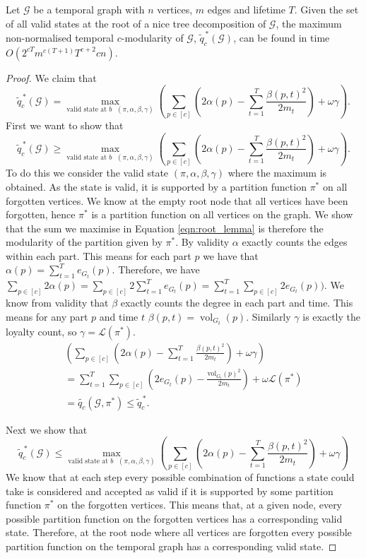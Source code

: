 \documentclass[runningheads]{llncs}
\DeclareMathOperator{\vol}{vol}
\newcommand{\cG}{\mathcal{G}}
\newcommand{\loy}{\mathcal{L}}
\begin{document}
\begin{lemma}\label{lem:tw root}
Let $\cG$ be a temporal graph with $n$ vertices, $m$ edges and lifetime $T$.
Given the set of all valid states at the root of a nice tree decomposition of $\cG$, the maximum non-normalised temporal $c$-modularity of $\cG$, $\widetilde{q}^{\,*}_c(\cG)$, can be found in time $O(2^{cT}m^{c(T+1)}T^{c+2}cn)$. 
\end{lemma}
\begin{proof}
We claim that
\begin{equation}\label{eqn:root_lemma}
\widetilde{q}^{\,*}_c(\cG)=\max_{\text{valid state at $b$ }(\pi,\alpha,\beta,\gamma)} \left(\sum_{p \in [c]} \left( 2\alpha(p) -\sum_{t=1}^T  \frac{\beta(p,t)^2}{2m_t}\right) + \omega \gamma\right).
\end{equation}
First we want to show that 
\[\widetilde{q}^{\,*}_c(\cG)\geq\max_{\text{valid state at $b$ }(\pi,\alpha,\beta,\gamma)} \left(\sum_{p \in [c]} \left( 2\alpha(p) -\sum_{t=1}^T  \frac{\beta(p,t)^2}{2m_t}\right) + \omega \gamma\right).\]
To do this we consider the valid state $(\pi,\alpha,\beta,\gamma)$ where the maximum is obtained. As the state is valid, it is supported by a partition function $\pi^*$ on all forgotten vertices. We know at the empty root node that all vertices have been forgotten, hence $\pi^*$ is a partition function on all vertices on the graph. 
We show that the sum we maximise in Equation \ref{eqn:root_lemma} is therefore the modularity of the partition given by $\pi^*$. 
By validity $\alpha$ exactly counts the edges within each part. This means for each part $p$ we have that $\alpha(p)=\sum_{t=1}^Te_{G_t}(p)$. Therefore, we have $\sum_{p \in [c]}2\alpha(p)=\sum_{p\in[c]} 2\sum_{t=1}^T e_{G_t}(p)=\sum_{t=1}^T \sum_{p \in [c]} 2e_{G_t}(p))$.
    We know from validity that $\beta$ exactly counts the degree in each part and time. This means for any part $p$ and time $t$ $\beta(p,t)=\vol_{G_t}(p)$.
    Similarly $\gamma$ is exactly the loyalty count, so $\gamma=\loy(\pi^*)$. 
\begin{align*}
\left(\sum_{p \in [c]} \left( 2\alpha(p) -\sum_{t=1}^T  \frac{\beta(p,t)^2}{2m_t}\right) + \omega \gamma\right)\\
 =\sum_{t=1}^T \sum_{p \in [c]} \left( 2e_{G_t}(p) - \frac{\text{vol}_{G_t}(p)^2}{2m_t}\right) + \omega \loy(\pi^*)\\
=\widetilde{q_c}(\cG,\pi^*) \leq \widetilde{q}^{\,*}_c.
\end{align*}

Next we show that
\[\widetilde{q}^{\,*}_c(\cG)\leq\max_{\text{valid state at $b$ }(\pi,\alpha,\beta,\gamma)} \left(\sum_{p \in [c]} \left( 2\alpha(p) -\sum_{t=1}^T  \frac{\beta(p,t)^2}{2m_t}\right) + \omega \gamma\right)\]
We know that at each step every possible combination of functions a state could take is considered and accepted as valid if it is supported by some partition function $\pi^*$ on the forgotten vertices. This means that, at a given node, every possible partition function on the forgotten vertices has a corresponding valid state. Therefore, at the root node where all vertices are forgotten every possible partition function on the temporal graph has a corresponding valid state.


\end{proof}
\end{document}
